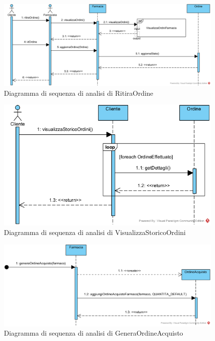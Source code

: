 \begin{figure}[!hbp]
	\centering
	\includegraphics[width=\linewidth]{assets/sequence_analisi/RitiraOrdine.png}
	\caption{Diagramma di sequenza di analisi di RitiraOrdine}
\end{figure}

\begin{figure}[!hbp]
	\centering
	\includegraphics[width=0.8\linewidth]{assets/sequence_analisi/VisualizzaStoricoOrdini.png}
	\caption{Diagramma di sequenza di analisi di VisualizzaStoricoOrdini}
\end{figure}

\begin{figure}[!hbp]
	\centering
	\includegraphics[width=0.9\linewidth]{assets/sequence_analisi/GeneraOrdineAcquisto.png}
	\caption{Diagramma di sequenza di analisi di GeneraOrdineAcquisto}
\end{figure}

